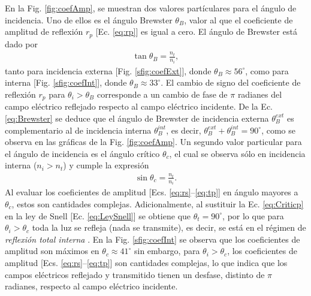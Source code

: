 En la Fig. \ref{fig:coefAmp}, se muestran dos valores partículares para el ángulo de incidencia. Uno de ellos es el  ángulo Brewster $\theta_B$, valor al que el coeficiente de amplitud de reflexión $r_p$ [Ec. \eqref{eq:rp}] es igual a cero. El ángulo de Brewster está dado por \cite{hecht1998optics} 
%
	\begin{align}
	\tan\theta_B = \frac{n_t}{n_i},
	\label{eq:Brewster}
	\end{align}
%	
tanto para incidencia externa [Fig. \ref{sfig:coefExt}], donde $\theta_B \approx 56^\circ$, como para interna [Fig. \ref{sfig:coefInt}], donde $\theta_B \approx 33^\circ$. El cambio de signo del coeficiente de reflexión $r_p$ para $\theta_i>\theta_B$ corresponde a un cambio de fase de $\pi$ radianes del campo eléctrico reflejado respecto al campo eléctrico incidente. De la Ec. \eqref{eq:Brewster} se deduce que el ángulo de Brewster de incidencia externa $\theta_B^{ext}$ es complementario al de incidencia interna $\theta_B^{int}$, es decir, $\theta_B^{ext}+\theta_B^{int} = 90^\circ$, como se observa en las gráficas de la Fig. \ref{fig:coefAmp}. Un segundo valor particular para el ángulo de incidencia es el ángulo crítico $\theta_c$, el cual se observa sólo en incidencia interna ($n_i>n_t$)  y  cumple la expresión \cite{hecht1998optics}
% 
	\begin{align}
	\sin\theta_c = \frac{n_t}{n_i}.
	\label{eq:Criticp}
	\end{align}
%
Al evaluar los coeficientes de amplitud  [Ecs. \eqref{eq:rs}--\eqref{eq:tp}] en ángulo mayores a $\theta_c$, estos son cantidades complejas. Adicionalmente, al sustituir la Ec. \eqref{eq:Criticp} en la ley de Snell [Ec. \eqref{eq:LeySnell}] se obtiene que $\theta_t = 90^\circ$, por lo que para $\theta_i>\theta_c$ toda la luz se refleja (nada se transmite), es decir, se está en el régimen de \emph{reflexión total interna} . En la Fig. \ref{sfig:coefInt} se observa que los coeficientes de amplitud son máximos en $\theta_c \approx 41^\circ$ sin embargo, para $\theta_i>\theta_c$, los coeficientes de amplitud  [Ecs. \eqref{eq:rs}--\eqref{eq:tp}] son cantidades complejas, lo que indica que los campos eléctricos reflejado y transmitido tienen un desfase, distinto de $\pi$ radianes, respecto al campo eléctrico incidente.  

